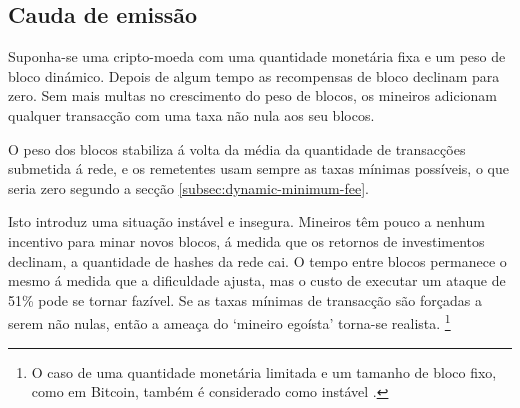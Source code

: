 \subsection{Cauda de emissão}
\label{subsec:emission-tail}

Suponha-se uma cripto-moeda com uma quantidade monetária fixa e um peso de bloco dinámico. Depois de algum tempo as recompensas de bloco declinam para zero. Sem mais multas no crescimento do peso de blocos, os mineiros adicionam qualquer transacção com uma taxa não nula aos seu blocos.


O peso dos blocos stabiliza á volta da média da quantidade de transacções submetida á rede, e os remetentes usam sempre as taxas mínimas possíveis, o que seria zero segundo a secção \ref{subsec:dynamic-minimum-fee}.


Isto introduz uma situação instável e insegura. Mineiros têm pouco a nenhum incentivo para minar novos blocos, á medida que os retornos de investimentos declinam, a quantidade de hashes da rede cai. O tempo entre blocos permanece o mesmo á medida que a dificuldade ajusta, mas o custo de executar um ataque de 51\% pode se tornar fazível. Se as taxas mínimas de transacção são forçadas a serem não nulas, então a ameaça do `mineiro egoísta' torna-se realista. 
\footnote{O caso de uma quantidade monetária limitada e um tamanho de bloco fixo, como em Bitcoin, também é considerado como instável \cite{no-reward-instability}.
}
 



